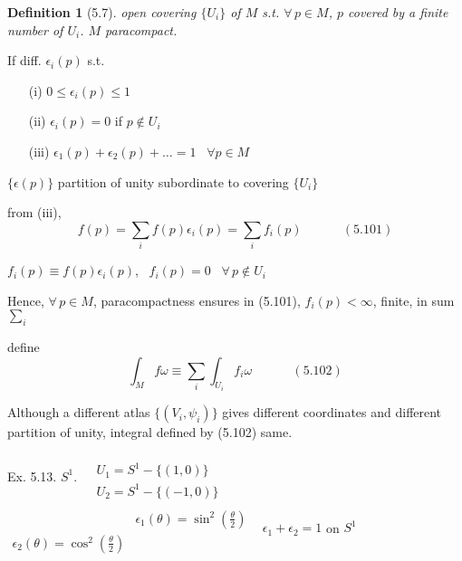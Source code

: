 \documentclass[twoside]{amsart}
\newtheorem{definition}{Definition}
\begin{document}
\begin{definition}[5.7]
  open covering $\lbrace U_i \rbrace$ of $M$ s.t. $\forall \, p \in M$, $p$ covered by a finite number of $U_i$.  $M$ paracompact.  
\end{definition}

If diff. $\epsilon_i(p)$ s.t. \begin{enumerate}
\item[(i)] $0\leq \epsilon_i(p) \leq 1$ 
\item[(ii)] $\epsilon_i(p) =0 $ if $p \notin U_i$ 
\item[(iii)] $\epsilon_1(p) + \epsilon_2(p) + \dots = 1$ \quad \, $\forall p \in M$
\end{enumerate}

$\lbrace \epsilon(p) \rbrace$ partition of unity subordinate to covering $\lbrace U_i \rbrace$

from (iii), 
\begin{equation}
  f(p) = \sum_i f(p) \epsilon_i(p) = \sum_i f_i(p) \quad \quad \quad \, (5.101)
\end{equation}

$f_i(p) \equiv f(p) \epsilon_i(p)$, \, $f_i(p) =0$ \, $\forall \, p \notin U_i$

 Hence, $\forall \, p \in M$, paracompactness ensures in (5.101),  $f_i(p) < \infty  $, finite, in sum $\sum_i$

define
\begin{equation}
\int_M f \omega \equiv \sum_i \int_{U_i} f_i \omega \quad \quad \quad \, (5.102)
\end{equation}

Although a different atlas $\lbrace (V_i, \psi_i)\rbrace$ gives different coordinates and different partition of unity, integral defined by (5.102) same.  

Ex. 5.13. $S^1$.  $\begin{aligned} & \quad \\ & U_1 = S^1 - \lbrace (1,0) \rbrace \\ & U_2 = S^1 - \lbrace (-1,0) \rbrace \end{aligned}$ \quad \quad \, $\begin{aligned} & \quad \\ & \epsilon_1(\theta) = \sin^2{ \left( \frac{ \theta}{2} \right) } \\ \epsilon_2(\theta) = \cos^2{ \left( \frac{\theta}{2} \right) } \end{aligned}$ \quad \quad \, $\epsilon_1 + \epsilon_2 = 1 $ on $S^1$
\end{document}
